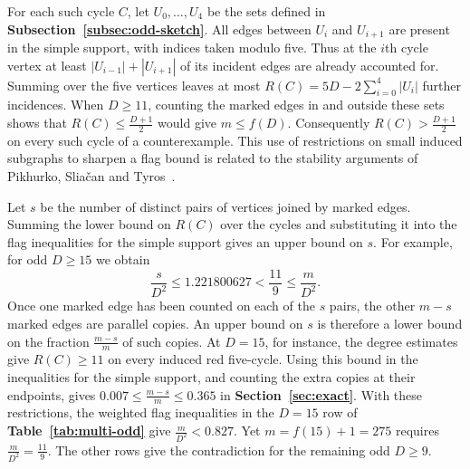 For each such cycle $C$, let $U_0,\ldots,U_4$ be the sets defined
in \textbf{Subsection~\ref{subsec:odd-sketch}}. All edges between
$U_i$ and $U_{i+1}$ are present in the simple support, with indices
taken modulo five. Thus at the $i$th cycle vertex at least
$|U_{i-1}|+|U_{i+1}|$ of its incident edges are already accounted for.
Summing over the five vertices leaves at most
$R(C)=5D-2\sum_{i=0}^4|U_i|$ further incidences.
When $D\geq11$, counting the marked edges in and outside these
sets shows that $R(C)\leq\frac{D+1}{2}$ would give $m\leq f(D)$.
Consequently $R(C)>\frac{D+1}{2}$ on every such cycle of a
counterexample. This use of restrictions on small induced subgraphs
to sharpen a flag bound is related to the stability arguments of
Pikhurko, Slia\v{c}an and Tyros~\cite{PikhurkoSliacanTyros2019}.

Let $s$ be the number of distinct pairs of vertices joined by
marked edges. Summing the lower bound on $R(C)$ over the cycles
and substituting it into the flag inequalities for the simple
support gives an upper bound on $s$. For example, for odd
$D\geq15$ we obtain
\[
  \frac{s}{D^2}\leq 1.221800627
  <\frac{11}{9}\leq\frac{m}{D^2}.
\]
Once one marked edge has been counted on each of the $s$ pairs,
the other $m-s$ marked edges are parallel copies. An upper bound
on $s$ is therefore a lower bound on the fraction $\frac{m-s}{m}$
of such copies. At $D=15$, for instance, the degree estimates give
$R(C)\geq11$ on every induced red five-cycle. Using this bound in the
inequalities for the simple support, and counting the extra copies at
their endpoints, gives $0.007\leq\frac{m-s}{m}\leq0.365$
in \textbf{Section~\ref{sec:exact}}.
With these restrictions, the weighted flag inequalities in the
$D=15$ row of \textbf{Table~\ref{tab:multi-odd}} give
$\frac{m}{D^2}<0.827$. Yet $m=f(15)+1=275$ requires
$\frac{m}{D^2}=\frac{11}{9}$. The other rows give the contradiction
for the remaining odd $D\geq9$.


